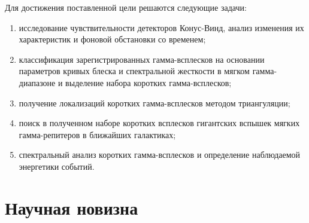 Для достижения поставленной цели решаются следующие задачи:
\begin{enumerate}
\item исследование чувствительности детекторов Конус-Винд, анализ изменения 
их характеристик и фоновой обстановки со временем;
\item классификация зарегистрированных гамма-всплесков на основании параметров 
кривых блеска и спектральной жесткости в мягком гамма-диапазоне и выделение набора коротких гамма-всплесков; 
\item получение локализаций коротких гамма-всплесков методом триангуляции; 
\item поиск в полученном наборе коротких всплесков гигантских 
вспышек мягких гамма-репитеров в ближайших галактиках;
\item спектральный анализ коротких гамма-всплесков и определение наблюдаемой энергетики событий.
\end{enumerate}

\section*{Научная новизна}

